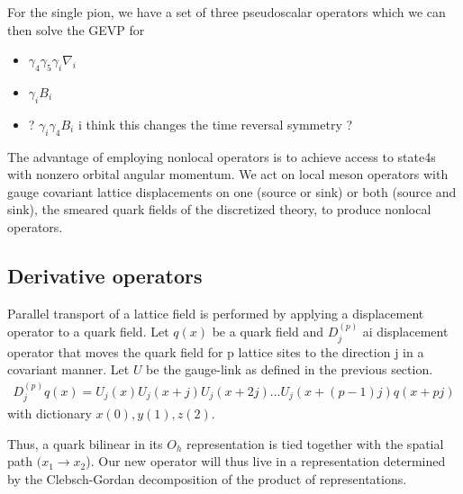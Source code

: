 \begin{table}
For the single pion, we have a set of three pseudoscalar operators which we can then solve the GEVP for
\begin{itemize} 
    \item $\gamma_4\gamma_5\gamma_i \nabla_i$
    \item $\gamma_iB_i$ 
    \item ? $\gamma_i\gamma_4B_i$ i think this changes the time reversal symmetry ? 
    
\end{itemize}
The advantage of employing nonlocal operators is to achieve access to state4s with nonzero orbital angular momentum. We act on local meson operators with gauge covariant lattice displacements on one (source or sink) or both (source and sink), the smeared quark fields of the discretized theory, to produce nonlocal operators. 

\subsection{Derivative operators}
Parallel transport of a lattice field is performed by applying a displacement operator to a quark field.  Let $q(x)$ be a quark field and $D_j^{(p)}$ ai displacement operator that moves the quark field for p lattice sites to the direction j in a covariant manner. Let $U$ be the gauge-link as defined in the previous section.
\begin{align}
    D_j^{(p)} q(x) = U_j(x) U_j(x+j) U_j(x+2j)...U_j(x+(p-1)j) q(x+pj)
\end{align}
with dictionary $x(0), y(1), z(2)$.

Thus, a quark bilinear in its $O_h$ representation is tied together with the spatial path $(x_1 \to x_2$). Our new operator will thus live in a representation determined by the Clebsch-Gordan decomposition of the product of representations. 


\end{table}
